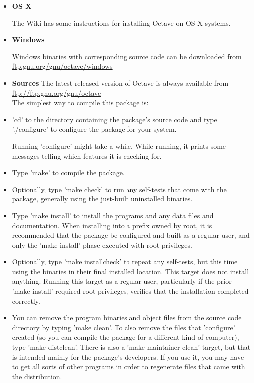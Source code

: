  \begin{itemize}
 \item \textbf{OS X}

 The Wiki has some instructions for installing Octave on OS X systems.\\
 
\item \textbf{Windows}
 
  Windows binaries with corresponding source code can be downloaded from
  \url{ftp.gnu.org/gnu/octave/windows}\\
 
 \item \textbf{Sources} 
 The latest released version of Octave is always available from \url{ftp://ftp.gnu.org/gnu/octave}\\
 
  The simplest way to compile this package is:

 
\item 'cd' to the directory containing the package's source code and type './configure' to configure the package for your system.
 
Running 'configure' might take a while.  While running, it prints
 some messages telling which features it is checking for.
 
\item Type 'make' to compile the package.
 
\item Optionally, type 'make check' to run any self-tests that come with
 the package, generally using the just-built uninstalled binaries.
 
\item Type 'make install' to install the programs and any data files and
 documentation.  When installing into a prefix owned by root, it is
 recommended that the package be configured and built as a regular
 user, and only the 'make install' phase executed with root
 privileges.
 
\item Optionally, type 'make installcheck' to repeat any self-tests, but
 this time using the binaries in their final installed location.
 This target does not install anything.  Running this target as a
 regular user, particularly if the prior 'make install' required
 root privileges, verifies that the installation completed
 correctly.
 
\item You can remove the program binaries and object files from the
 source code directory by typing 'make clean'.  To also remove the
 files that 'configure' created (so you can compile the package for
 a different kind of computer), type 'make distclean'.  There is
 also a 'make maintainer-clean' target, but that is intended mainly
 for the package's developers.  If you use it, you may have to get
 all sorts of other programs in order to regenerate files that came
 with the distribution.
 

\end{itemize}
